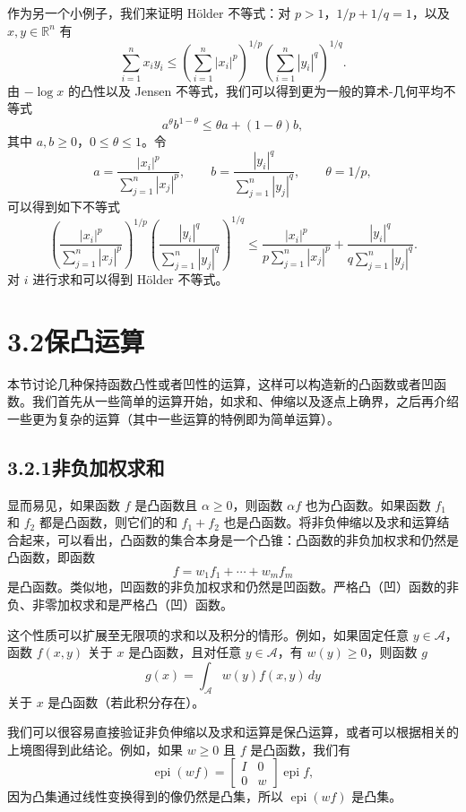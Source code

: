 \documentclass[UTF8, 12pt, fontset=fandol, oneside]{ctexart}
\DeclareMathOperator{\epi}{epi}
\begin{document}
作为另一个小例子，我们来证明 Hölder 不等式：对 $p>1$，$1/p+1/q=1$，以及 $x,y\in\mathbb{R}^n$ 有
\[
\sum_{i=1}^n x_i y_i
\leq
\left(\sum_{i=1}^n |x_i|^p\right)^{1/p}
\left(\sum_{i=1}^n |y_i|^q\right)^{1/q}.
\]
由 $-\log x$ 的凸性以及 Jensen 不等式，我们可以得到更为一般的算术-几何平均不等式
\[
a^\theta b^{1-\theta}\leq \theta a+(1-\theta)b,
\]
其中 $a,b\geq0$，$0\leq\theta\leq1$。令
\[
a=\frac{|x_i|^p}{\sum_{j=1}^n |x_j|^p},\qquad
b=\frac{|y_i|^q}{\sum_{j=1}^n |y_j|^q},\qquad
\theta=1/p,
\]
可以得到如下不等式
\[
\left(
\frac{|x_i|^p}{\sum_{j=1}^n |x_j|^p}
\right)^{1/p}
\left(
\frac{|y_i|^q}{\sum_{j=1}^n |y_j|^q}
\right)^{1/q}
\leq
\frac{|x_i|^p}{p\sum_{j=1}^n |x_j|^p}
+
\frac{|y_i|^q}{q\sum_{j=1}^n |y_j|^q}.
\]
对 $i$ 进行求和可以得到 Hölder 不等式。

\section*{3.2\quad 保凸运算}

本节讨论几种保持函数凸性或者凹性的运算，这样可以构造新的凸函数或者凹函数。我们首先从一些简单的运算开始，如求和、伸缩以及逐点上确界，之后再介绍一些更为复杂的运算（其中一些运算的特例即为简单运算）。

\subsection*{3.2.1\quad 非负加权求和}

显而易见，如果函数 $f$ 是凸函数且 $\alpha\geq0$，则函数 $\alpha f$ 也为凸函数。如果函数 $f_1$ 和 $f_2$ 都是凸函数，则它们的和 $f_1+f_2$ 也是凸函数。将非负伸缩以及求和运算结合起来，可以看出，凸函数的集合本身是一个凸锥：凸函数的非负加权求和仍然是凸函数，即函数
\[
f=w_1f_1+\cdots+w_mf_m
\]
是凸函数。类似地，凹函数的非负加权求和仍然是凹函数。严格凸（凹）函数的非负、非零加权求和是严格凸（凹）函数。

这个性质可以扩展至无限项的求和以及积分的情形。例如，如果固定任意 $y\in\mathcal{A}$，函数 $f(x,y)$ 关于 $x$ 是凸函数，且对任意 $y\in\mathcal{A}$，有 $w(y)\geq0$，则函数 $g$
\[
g(x)=\int_{\mathcal{A}} w(y)f(x,y)\,dy
\]
关于 $x$ 是凸函数（若此积分存在）。

我们可以很容易直接验证非负伸缩以及求和运算是保凸运算，或者可以根据相关的上境图得到此结论。例如，如果 $w\geq0$ 且 $f$ 是凸函数，我们有
\[
\epi(wf)=
\begin{bmatrix}
I & 0\\
0 & w
\end{bmatrix}
\epi f,
\]
因为凸集通过线性变换得到的像仍然是凸集，所以 $\epi(wf)$ 是凸集。
\end{document}
